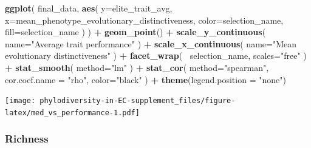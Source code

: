 \documentclass[]{book}
\newenvironment{Shaded}{\begin{snugshade}}{\end{snugshade}}
\newcommand{\DataTypeTok}[1]{\textcolor[rgb]{0.13,0.29,0.53}{#1}}
\newcommand{\KeywordTok}[1]{\textcolor[rgb]{0.13,0.29,0.53}{\textbf{#1}}}
\newcommand{\NormalTok}[1]{#1}
\newcommand{\OperatorTok}[1]{\textcolor[rgb]{0.81,0.36,0.00}{\textbf{#1}}}
\newcommand{\StringTok}[1]{\textcolor[rgb]{0.31,0.60,0.02}{#1}}
\begin{document}
\begin{Shaded}
\begin{Highlighting}[]
\KeywordTok{ggplot}\NormalTok{(}
\NormalTok{    final_data,}
    \KeywordTok{aes}\NormalTok{(}
        \DataTypeTok{y=}\NormalTok{elite_trait_avg,}
        \DataTypeTok{x=}\NormalTok{mean_phenotype_evolutionary_distinctiveness,}
        \DataTypeTok{color=}\NormalTok{selection_name,}
        \DataTypeTok{fill=}\NormalTok{selection_name}
\NormalTok{    )}
\NormalTok{  ) }\OperatorTok{+}
\StringTok{  }\KeywordTok{geom_point}\NormalTok{() }\OperatorTok{+}
\StringTok{    }\KeywordTok{scale_y_continuous}\NormalTok{(}
        \DataTypeTok{name=}\StringTok{"Average trait performance"}
\NormalTok{  ) }\OperatorTok{+}
\StringTok{  }\KeywordTok{scale_x_continuous}\NormalTok{(}
        \DataTypeTok{name=}\StringTok{"Mean evolutionary distinctiveness"}
\NormalTok{  ) }\OperatorTok{+}\StringTok{ }
\StringTok{  }\KeywordTok{facet_wrap}\NormalTok{(}
      \OperatorTok{~}\NormalTok{selection_name, }\DataTypeTok{scales=}\StringTok{"free"}
\NormalTok{  ) }\OperatorTok{+}\StringTok{ }
\StringTok{  }\KeywordTok{stat_smooth}\NormalTok{(}
    \DataTypeTok{method=}\StringTok{"lm"}
\NormalTok{  ) }\OperatorTok{+}\StringTok{ }
\StringTok{  }\KeywordTok{stat_cor}\NormalTok{(}
    \DataTypeTok{method=}\StringTok{"spearman"}\NormalTok{, }\DataTypeTok{cor.coef.name =} \StringTok{"rho"}\NormalTok{, }\DataTypeTok{color=}\StringTok{"black"}
\NormalTok{  ) }\OperatorTok{+}
\StringTok{  }\KeywordTok{theme}\NormalTok{(}\DataTypeTok{legend.position =} \StringTok{"none"}\NormalTok{)}
\end{Highlighting}
\end{Shaded}

\texttt{[image: phylodiversity-in-EC-supplement\_files/figure-latex/med\_vs\_performance-1.pdf]}

\hypertarget{richness-4}{%
\subsubsection{Richness}\label{richness-4}}
\end{document}
